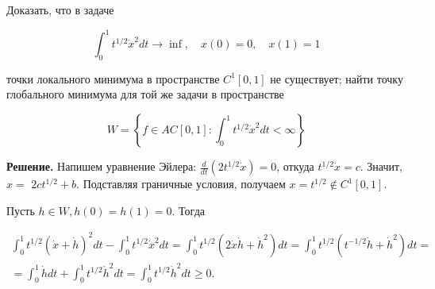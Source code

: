 \begin{task}
    Доказать, что в задаче
    
    $$
    \int_{0}^{1} t^{1 / 2} \dot{x}^{2} d t \rightarrow \inf , \quad x(0)=0, \quad x(1)=1
    $$
    
    точки локального минимума в пространстве $C^{1}[0,1]$ не существует; найти точку глобального минимума для той же задачи в пространстве
    
    $$
    W=\left\{f \in A C[0,1]: \int_{0}^{1} t^{1 / 2} \dot{x}^{2} d t<\infty\right\}
    $$
    
    \textbf{Решение.} Напишем уравнение Эйлера: $\frac{d}{d t}\left(2 t^{1 / 2} \dot{x}\right)=0$, откуда $t^{1 / 2} \dot{x}=c$. Значит, $x=$ $2 c t^{1 / 2}+b$. Подставляя граничные условия, получаем $x=t^{1 / 2} \notin C^{1}[0,1]$.
    
    Пусть $h \in W, h(0)=h(1)=0$. Тогда
    
    $$
    \begin{gathered}
    \int_{0}^{1} t^{1 / 2}(\dot{x}+\dot{h})^{2} d t-\int_{0}^{1} t^{1 / 2} \dot{x}^{2} d t=\int_{0}^{1} t^{1 / 2}\left(2 \dot{x} \dot{h}+\dot{h}^{2}\right) d t=\int_{0}^{1} t^{1 / 2}\left(t^{-1 / 2} \dot{h}+\dot{h}^{2}\right) d t= \\
    =\int_{0}^{1} \dot{h} d t+\int_{0}^{1} t^{1 / 2} \dot{h}^{2} d t=\int_{0}^{1} t^{1 / 2} \dot{h}^{2} d t \geqslant 0 .
    \end{gathered}
    $$
\end{task}
    